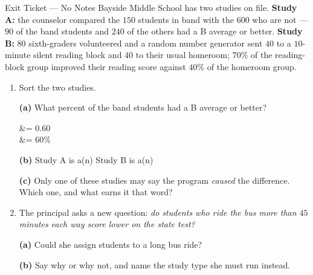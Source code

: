 \documentclass[10pt]{article}
\begin{document}

\vspace{0.15in}

\begin{notesbox}{Exit Ticket --- No Notes}
\small
Bayside Middle School has two studies on file. \textbf{Study A:} the counselor
compared the $150$ students in band with the $600$ who are not --- $90$ of the
band students and $240$ of the others had a B average or better. \textbf{Study
B:} $80$ sixth-graders volunteered and a random number generator sent $40$ to a
$10$-minute silent reading block and $40$ to their usual homeroom; $70\%$ of the
reading-block group improved their reading score against $40\%$ of the homeroom
group.

\begin{enumerate}[leftmargin=1.6em, itemsep=8pt, topsep=3pt]

  \item Sort the two studies.

        \textbf{(a)} What percent of the band students had a B average or
        better?

        \begin{work}
           &= 0.60 \\
                          &= 60\%
        \end{work}

        \textbf{(b)} Study A is a(n)  \hfill Study B is
        a(n) 

        \textbf{(c)} Only one of these studies may say the program
        \emph{caused} the difference. Which one, and what earns it that word?

  \item The principal asks a new question: \emph{do students who ride the bus
        more than $45$ minutes each way score lower on the state test?}

        \textbf{(a)} Could she assign students to a long bus ride? 

        \textbf{(b)} Say why or why not, and name the study type she must run
        instead.


\end{enumerate}
\end{notesbox}
\end{document}
